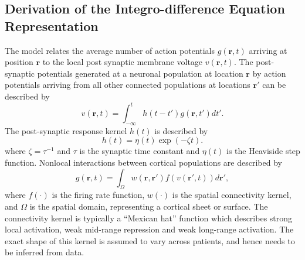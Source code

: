 \documentclass[12pt]{iopart}
\begin{document}
\subsection{Derivation of the Integro-difference Equation Representation}
The model relates the average number of action potentials $g(\mathbf{r},t)$ arriving at position $\mathbf{r}$ to the local post synaptic membrane voltage $v(\mathbf{r},t)$. The post-synaptic potentials generated at a neuronal population at location $\mathbf{r}$ by action potentials arriving from all other connected populations at locations $\mathbf{r}'$ can be described by 
\begin{equation}
	\label{SpikesToPotential} v\left( {\mathbf{r},t} \right) = \int_{ - \infty }^t {h\left( {t - t'} \right)g\left( {\mathbf{r},t'} \right)dt'}. 
\end{equation}
The post-synaptic response kernel $h(t)$ is described by 
\begin{equation}
	\label{SynapticRespKernel} h(t) = \eta(t)\exp{\left(-\zeta t\right)}. 
\end{equation}
where $\zeta=\tau^{-1}$ and $\tau$ is the synaptic time constant and $\eta(t)$ is the Heaviside step function. Nonlocal interactions between cortical populations are described by 
\begin{equation}
	\label{RateBasedInteractions} g\left( \mathbf{r},t \right) = \int_\Omega {w\left( \mathbf{r},\mathbf{r}' \right)f\left( v\left( \mathbf{r}',t \right) \right)d\mathbf{r}'}, 
\end{equation}
where $f(\cdot)$ is the firing rate function, $w(\cdot)$ is the spatial connectivity kernel, and $\Omega$ is the spatial domain, representing a cortical sheet or surface. The connectivity kernel is typically a ``Mexican hat'' function which describes strong local activation, weak mid-range repression and weak long-range activation. The exact shape of this kernel is assumed to vary across patients, and hence needs to be inferred from data. 
\end{document}
